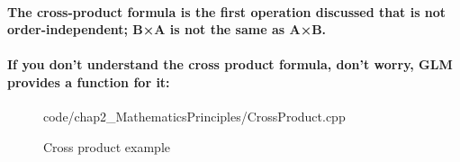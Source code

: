 \paragraph{
The cross-product formula is the first operation discussed that is not order-independent; B×A is not the same as A×B.
}

\paragraph{
If you don't understand the cross product formula, don't worry, GLM provides a function for it:
}

\begin{frame}{}
    \begin{figure}[ht]
    \centering
    \colorbox{backgroundcolor}{
        \parbox{0.9\textwidth}{
            
            {code/chap2_MathematicsPrinciples/CrossProduct.cpp}
        }
    }
    \caption{Cross product example}
    \label{fig:cross_product_example}
    \end{figure}
\end{frame}
